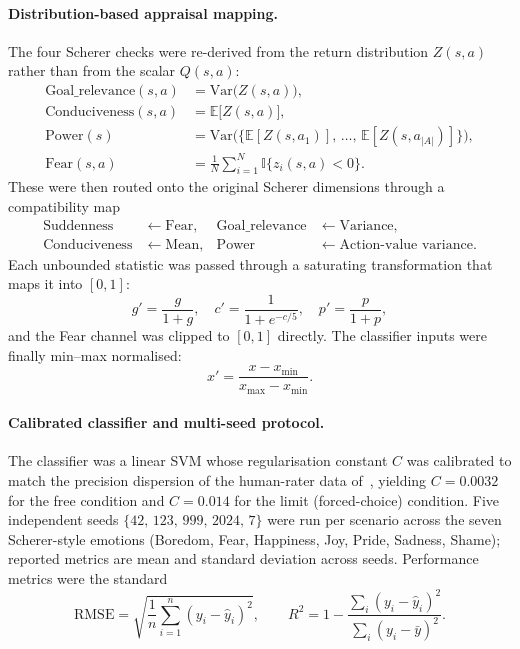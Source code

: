 \documentclass[conference]{IEEEtran}
\begin{document}
\paragraph{Distribution-based appraisal mapping.} The four Scherer
checks were re-derived from the return distribution $Z(s, a)$ rather
than from the scalar $Q(s, a)$:
\begin{align}
\text{Goal\_relevance}(s, a) &= \mathrm{Var}\big(Z(s, a)\big),
   \label{eq:m2a_gr}\\[2pt]
\text{Conduciveness}(s, a) &= \mathbb{E}\big[Z(s, a)\big],
   \label{eq:m2a_cond}\\[2pt]
\text{Power}(s) &= \mathrm{Var}\!\Big(\big\{\mathbb{E}[Z(s, a_{1})],\, \dots,\, \mathbb{E}[Z(s, a_{|A|})]\big\}\Big),
   \label{eq:m2a_pow}\\[2pt]
\text{Fear}(s, a) &= \frac{1}{N}\sum_{i=1}^{N} \mathbb{I}\{z_{i}(s, a) < 0\}.
   \label{eq:m2a_fear}
\end{align}
These were then routed onto the original Scherer dimensions through a
compatibility map
\begin{equation*}
\begin{aligned}
\text{Suddenness} &\leftarrow \text{Fear}, &
\text{Goal\_relevance} &\leftarrow \text{Variance}, \\
\text{Conduciveness} &\leftarrow \text{Mean}, &
\text{Power} &\leftarrow \text{Action-value variance}.
\end{aligned}
\end{equation*}
Each unbounded statistic was passed through a saturating
transformation that maps it into $[0, 1]$:
\begin{equation}
g' = \frac{g}{1 + g},
\quad
c' = \frac{1}{1 + e^{-c/5}},
\quad
p' = \frac{p}{1 + p},
\label{eq:m2a_transforms}
\end{equation}
and the Fear channel was clipped to $[0, 1]$ directly. The classifier
inputs were finally min--max normalised:
\begin{equation}
x' = \frac{x - x_{\min}}{x_{\max} - x_{\min}}.
\label{eq:m2a_norm}
\end{equation}

\paragraph{Calibrated classifier and multi-seed protocol.} The
classifier was a linear SVM whose regularisation constant $C$ was
calibrated to match the precision dispersion of the human-rater
data of~\cite{zhang2023modeling}, yielding $C = 0.0032$ for the free
condition and $C = 0.014$ for the limit (forced-choice) condition.
Five independent seeds $\{42,\, 123,\, 999,\, 2024,\, 7\}$ were run
per scenario across the seven Scherer-style emotions (Boredom, Fear,
Happiness, Joy, Pride, Sadness, Shame); reported metrics are mean and
standard deviation across seeds. Performance metrics were the standard
\begin{equation}
\text{RMSE} = \sqrt{\frac{1}{n}\sum_{i=1}^{n}(y_{i} - \hat y_{i})^{2}},
\qquad
R^{2} = 1 - \frac{\sum_{i}(y_{i} - \hat y_{i})^{2}}{\sum_{i}(y_{i} - \bar y)^{2}}.
\label{eq:m2a_metrics}
\end{equation}
\end{document}
